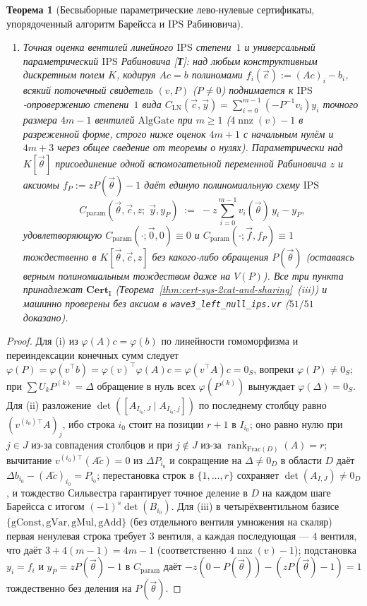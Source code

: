 \documentclass[11pt]{article}
\theoremstyle{plain}
\newtheorem{theorem}{Теорема}[section]
\theoremstyle{definition}
\begin{document}
\begin{theorem}[Бесвыборные параметрические лево-нулевые сертификаты, упорядоченный алгоритм Барейсса и $\mathrm{IPS}$ Рабиновича]
\begin{enumerate}[nosep,label=(\roman*)]
\item \emph{Точная оценка вентилей линейного $\mathrm{IPS}$ степени~$1$ и универсальный параметрический $\mathrm{IPS}$ Рабиновича \textup{[\textbf{Т}]}}: над любым конструктивным дискретным полем $K$, кодируя $Ac = b$ полиномами $f_i(\vec{c}) := (Ac)_i - b_i$, всякий поточечный свидетель $(v, P)$ ($P \neq 0$) поднимается к $\mathrm{IPS}$-опровержению степени~$1$ вида $C_{\mathrm{LN}}(\vec{c}, \vec{y}) = \sum_{i=0}^{m-1} (-P^{-1} v_i) y_i$ точного размера $4m - 1$ вентилей $\mathrm{AlgGate}$ при $m \ge 1$ ($4\operatorname{nnz}(v) - 1$ в разреженной форме, строго ниже оценок $4m + 1$ с начальным нулём и $4m + 3$ через общее сведение от теоремы о нулях). Параметрически над $K[\vec{\theta}]$ присоединение одной вспомогательной переменной Рабиновича $z$ и аксиомы $f_P := z P(\vec{\theta}) - 1$ даёт единую полиномиальную схему $\mathrm{IPS}$
\[
  C_{\mathrm{param}}(\vec{\theta}, \vec{c}, z;\; \vec{y}, y_P) \;:=\; -z \sum_{i=0}^{m-1} v_i(\vec{\theta})\, y_i - y_P,
\]
удовлетворяющую $C_{\mathrm{param}}(\cdot; \vec{0}, 0) \equiv 0$ и $C_{\mathrm{param}}(\cdot; \vec{f}, f_P) \equiv 1$ тождественно в $K[\vec{\theta}, \vec{c}, z]$ \emph{без какого-либо обращения $P(\vec{\theta})$} (оставаясь верным полиномиальным тождеством даже на $V(P)$). Все три пункта принадлежат $\mathbf{Cert}_{\mathrm{I}}$ (Теорема~\ref{thm:cert-sys-2cat-and-sharing}~(iii)) и машинно проверены без аксиом в \texttt{wave3\_left\_null\_ips.vr} ($51/51$ доказано).
\end{enumerate}
\end{theorem}
\begin{proof}
Для (i) из $\varphi(A)c = \varphi(b)$ по линейности гомоморфизма и переиндексации конечных сумм следует $\varphi(P) = \varphi(v^\top b) = \varphi(v)^\top \varphi(A) c = \varphi(v^\top A) c = 0_S$, вопреки $\varphi(P) \neq 0_S$; при $\sum U_k P^{(k)} = \Delta$ обращение в нуль всех $\varphi(P^{(k)})$ вынуждает $\varphi(\Delta) = 0_S$. Для (ii) разложение $\det([A_{I_{i_0}, J} \mid A_{I_{i_0}, j}])$ по последнему столбцу равно $(v^{(i_0)\top} A)_j$, ибо строка $i_0$ стоит на позиции $r+1$ в $I_{i_0}$; оно равно нулю при $j \in J$ из-за совпадения столбцов и при $j \notin J$ из-за $\operatorname{rank}_{\mathrm{Frac}(D)}(A) = r$; вычитание $v^{(i_0)\top}(A\tilde{c}) = 0$ из $\Delta P_{i_0}$ и сокращение на $\Delta \neq 0_D$ в области $D$ даёт $\Delta b_{i_0} - (A\tilde{c})_{i_0} = P_{i_0}$; перестановка строк в $\{1,\dots,r\}$ сохраняет $\det(A_{I,J}) \neq 0_D$, и тождество Сильвестра гарантирует точное деление в $D$ на каждом шаге Барейсса с итогом $(-1)^s \det(B_{i_0})$. Для (iii) в четырёхвентильном базисе $\{\mathrm{gConst}, \mathrm{gVar}, \mathrm{gMul}, \mathrm{gAdd}\}$ (без отдельного вентиля умножения на скаляр) первая ненулевая строка требует $3$ вентиля, а каждая последующая --- $4$ вентиля, что даёт $3 + 4(m-1) = 4m - 1$ (соответственно $4\operatorname{nnz}(v) - 1$); подстановка $y_i = f_i$ и $y_P = z P(\vec{\theta}) - 1$ в $C_{\mathrm{param}}$ даёт $-z(0 - P(\vec{\theta})) - (z P(\vec{\theta}) - 1) = 1$ тождественно без деления на $P(\vec{\theta})$.
\end{proof}
\end{document}
